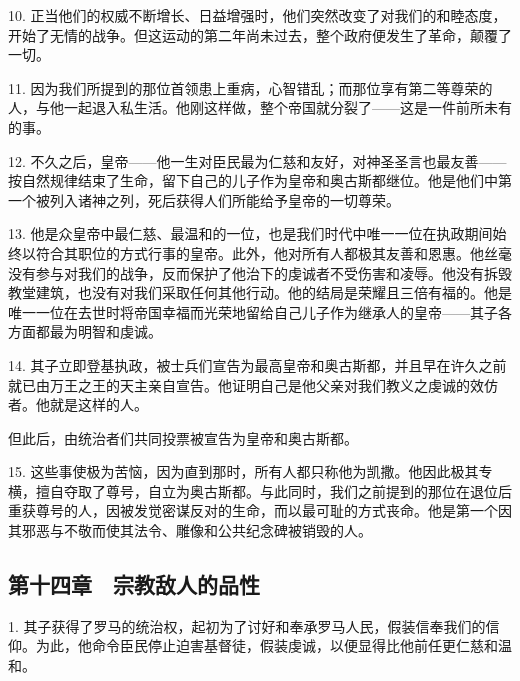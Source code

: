 10. 正当他们的权威不断增长、日益增强时，他们突然改变了对我们的和睦态度，开始了无情的战争。但这运动的第二年尚未过去，整个政府便发生了革命，颠覆了一切。\par

11. 因为我们所提到的那位首领患上重病，心智错乱；而那位享有第二等尊荣的人，与他一起退入私生活。他刚这样做，整个帝国就分裂了——这是一件前所未有的事。\par

12. 不久之后，皇帝——他一生对臣民最为仁慈和友好，对神圣圣言也最友善——按自然规律结束了生命，留下自己的儿子作为皇帝和奥古斯都继位。他是他们中第一个被列入诸神之列，死后获得人们所能给予皇帝的一切尊荣。\par

13. 他是众皇帝中最仁慈、最温和的一位，也是我们时代中唯一一位在执政期间始终以符合其职位的方式行事的皇帝。此外，他对所有人都极其友善和恩惠。他丝毫没有参与对我们的战争，反而保护了他治下的虔诚者不受伤害和凌辱。他没有拆毁教堂建筑，也没有对我们采取任何其他行动。他的结局是荣耀且三倍有福的。他是唯一一位在去世时将帝国幸福而光荣地留给自己儿子作为继承人的皇帝——其子各方面都最为明智和虔诚。\par

14. 其子立即登基执政，被士兵们宣告为最高皇帝和奥古斯都，并且早在许久之前就已由万王之王的天主亲自宣告。他证明自己是他父亲对我们教义之虔诚的效仿者。他就是这样的人。\par

但此后，由统治者们共同投票被宣告为皇帝和奥古斯都。\par

15. 这些事使极为苦恼，因为直到那时，所有人都只称他为凯撒。他因此极其专横，擅自夺取了尊号，自立为奥古斯都。与此同时，我们之前提到的那位在退位后重获尊号的人，因被发觉密谋反对的生命，而以最可耻的方式丧命。他是第一个因其邪恶与不敬而使其法令、雕像和公共纪念碑被销毁的人。\par


\subsection{第十四章　宗教敌人的品性}

1. 其子获得了罗马的统治权，起初为了讨好和奉承罗马人民，假装信奉我们的信仰。为此，他命令臣民停止迫害基督徒，假装虔诚，以便显得比他前任更仁慈和温和。\par

